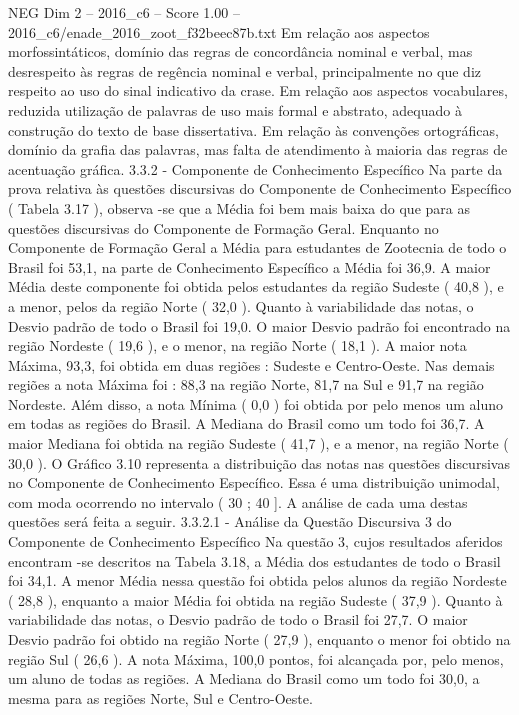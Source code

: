 \begin{textsample}{NEG Dim 2 – 2016\_c6 – Score 1.00 – 2016\_c6/enade\_2016\_zoot\_f32beec87b.txt}
Em relação aos aspectos morfossintáticos, domínio das regras de concordância nominal e verbal, mas desrespeito às regras de regência nominal e verbal, principalmente no que diz respeito ao uso do sinal indicativo da crase.
Em relação aos aspectos vocabulares, reduzida utilização de palavras de uso mais formal e abstrato, adequado à construção do texto de base dissertativa.
Em relação às convenções ortográficas, domínio da grafia das palavras, mas falta de atendimento à maioria das regras de acentuação gráfica. 3.3.2 - Componente de Conhecimento Específico Na parte da prova relativa às questões discursivas do Componente de Conhecimento Específico ( Tabela 3.17 ), observa -se que a Média foi bem mais baixa do que para as questões discursivas do Componente de Formação Geral.
Enquanto no Componente de Formação Geral a Média para estudantes de Zootecnia de todo o Brasil foi 53,1, na parte de Conhecimento Específico a Média foi 36,9.
A maior Média deste componente foi obtida pelos estudantes da região Sudeste ( 40,8 ), e a menor, pelos da região Norte ( 32,0 ).
Quanto à variabilidade das notas, o Desvio padrão de todo o Brasil foi 19,0.
O maior Desvio padrão foi encontrado na região Nordeste ( 19,6 ), e o menor, na região Norte ( 18,1 ).
A maior nota Máxima, 93,3, foi obtida em duas regiões : Sudeste e Centro-Oeste.
Nas demais regiões a nota Máxima foi : 88,3 na região Norte, 81,7 na Sul e 91,7 na região Nordeste.
Além disso, a nota Mínima ( 0,0 ) foi obtida por pelo menos um aluno em todas as regiões do Brasil.
A Mediana do Brasil como um todo foi 36,7.
A maior Mediana foi obtida na região Sudeste ( 41,7 ), e a menor, na região Norte ( 30,0 ).
O Gráfico 3.10 representa a distribuição das notas nas questões discursivas no Componente de Conhecimento Específico.
Essa é uma distribuição unimodal, com moda ocorrendo no intervalo ( 30 ; 40 ].
A análise de cada uma destas questões será feita a seguir. 3.3.2.1 - Análise da Questão Discursiva 3 do Componente de Conhecimento Específico Na questão 3, cujos resultados aferidos encontram -se descritos na Tabela 3.18, a Média dos estudantes de todo o Brasil foi 34,1.
A menor Média nessa questão foi obtida pelos alunos da região Nordeste ( 28,8 ), enquanto a maior Média foi obtida na região Sudeste ( 37,9 ).
Quanto à variabilidade das notas, o Desvio padrão de todo o Brasil foi 27,7.
O maior Desvio padrão foi obtido na região Norte ( 27,9 ), enquanto o menor foi obtido na região Sul ( 26,6 ).
A nota Máxima, 100,0 pontos, foi alcançada por, pelo menos, um aluno de todas as regiões.
A Mediana do Brasil como um todo foi 30,0, a mesma para as regiões Norte, Sul e Centro-Oeste.

\end{textsample}
